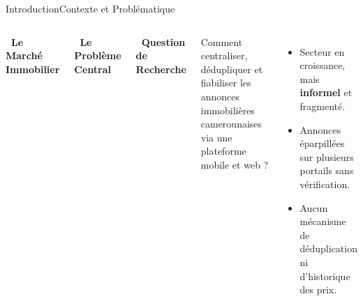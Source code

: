 \begin{frame}{Introduction}{Contexte et Problématique}
  \begin{columns}[T]
      \begin{center}
        \textbf{\color{UY1Purple} \faChartBar\ Le Marché Immobilier}\\[0.2cm]
      \end{center}
      \vspace{0.4cm}
      \begin{center}
        \textbf{\color{UY1Accent} \faExclamationTriangle\ Le Problème Central}\\[0.2cm]
      \end{center}

      \vspace{0.8cm}
      \begin{center}
        \textbf{\color{UY1Purple} \faQuestionCircle\ Question de Recherche}
      \end{center}
      \vspace{0.2cm}
      \begin{block}{}
        \centering Comment centraliser, dédupliquer et fiabiliser les annonces immobilières camerounaises via une plateforme mobile et web ?
      \end{block}
      \vspace{0.3cm}
      \footnotesize
      \begin{itemize}
        \item Secteur en croissance, mais \textbf{informel} et fragmenté.
        \item Annonces éparpillées sur plusieurs portails sans vérification.
        \item Aucun mécanisme de déduplication ni d'historique des prix.
      \end{itemize}
  \end{columns}
\end{frame}